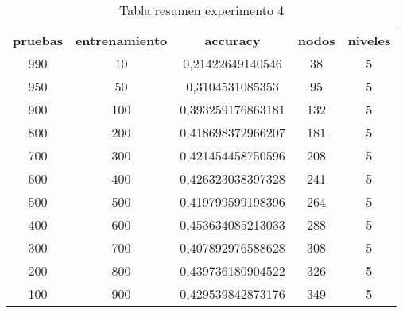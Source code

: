 \begin{table}[h]
	\centering
	\caption{Tabla resumen experimento 4}
	\label{my-label}
	\begin{tabular}{ccccc}
		\textbf{pruebas} & \textbf{entrenamiento} & \textbf{accuracy} & \textbf{nodos} & \textbf{niveles} \\
		990              & 10                     & 0,21422649140546  & 38             & 5                \\
		950              & 50                     & 0,3104531085353   & 95             & 5                \\
		900              & 100                    & 0,393259176863181 & 132            & 5                \\
		800              & 200                    & 0,418698372966207 & 181            & 5                \\
		700              & 300                    & 0,421454458750596 & 208            & 5                \\
		600              & 400                    & 0,426323038397328 & 241            & 5                \\
		500              & 500                    & 0,419799599198396 & 264            & 5                \\
		400              & 600                    & 0,453634085213033 & 288            & 5                \\
		300              & 700                    & 0,407892976588628 & 308            & 5                \\
		200              & 800                    & 0,439736180904522 & 326            & 5                \\
		100              & 900                    & 0,429539842873176 & 349            & 5               
	\end{tabular}
\end{table}

\begin{table}[]
	\centering

	\label{my-label}
	\caption{Tabla resumen de simbolos y frecuencia para experimento 4}
\end{table}

